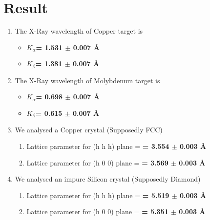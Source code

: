 \documentclass[]{report}[12 pt]
\begin{document}
  \section*{Result}
 \begin{enumerate}
 	\item The X-Ray wavelength of Copper target is 
 	\begin{itemize}
 		\item 	$K_{\alpha}$\textbf{= 1.531 $\pm$ 0.007 \AA}
 		\item 	$K_{\beta}$\textbf{= 1.381 $\pm$ 0.007 \AA}
 	\end{itemize}
\item The X-Ray wavelength of Molybdenum target is 
 	\begin{itemize}
 		\item 	$K_{\alpha}$\textbf{= 0.698 $\pm$ 0.007 \AA}
 		\item 	$K_{\beta}$\textbf{= 0.615 $\pm$ 0.007 \AA}
 	\end{itemize}
 	\item We analysed a Copper crystal (Supposedly FCC)
\begin{enumerate}
\item Lattice parameter for (h h h) plane = \textbf{= 3.554 $\pm$ 0.003 \AA}
\item Lattice parameter for (h 0 0) plane = \textbf{= 3.569 $\pm$ 0.003 \AA}
\end{enumerate}
 	\item We analysed an impure Silicon crystal (Supposedly Diamond)
\begin{enumerate}
	\item Lattice parameter for (h h h) plane = \textbf{= 5.519 $\pm$ 0.003 \AA}
	\item Lattice parameter for (h 0 0) plane = \textbf{= 5.351 $\pm$ 0.003 \AA}
\end{enumerate}
 \end{enumerate}
\end{document}
